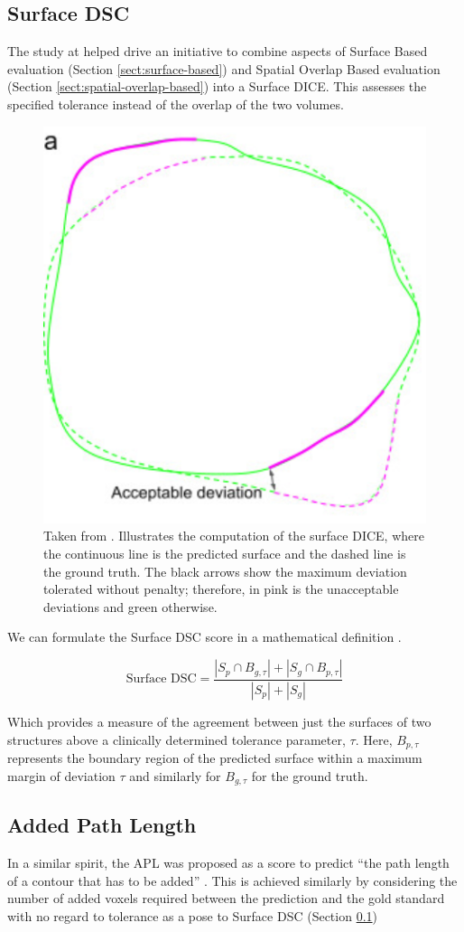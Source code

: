 \documentclass[11pt,twoside]{report}
\begin{document}
\subsection{Surface DSC} \label{sect:surface-DSC}

The study at \cite{Sherer2021-le} helped drive an initiative to combine aspects of Surface Based evaluation (Section \ref{sect:surface-based}) and Spatial Overlap Based evaluation (Section \ref{sect:spatial-overlap-based}) into a Surface DICE. This assesses the specified tolerance instead of the overlap of the two volumes. 

\begin{figure}[H]
  \centering
  \includegraphics[width=0.3\linewidth]{../figures/Surface-dice.png}
  \caption{Taken from \cite{Nikolov2021-xe}. Illustrates the computation of the surface DICE, where the continuous line is the predicted surface and the dashed line is the ground truth. The black arrows show the maximum deviation tolerated without penalty; therefore, in pink is the unacceptable deviations and green otherwise.}
\end{figure}

We can formulate the Surface DSC score in a mathematical definition \cite{Sherer2021-le}.

\begin{equation*}
  \text{Surface DSC} = \frac{|S_p \cap B_{g,\tau}| + |S_g \cap B_{p,\tau}|}{|S_p| + |S_g|}
\end{equation*}

Which provides a measure of the agreement between just the surfaces of two structures above a clinically determined tolerance parameter, $\tau$. Here, $B_{p,\tau}$ represents the  boundary region of the predicted surface within a maximum margin of deviation $\tau$ and similarly for $B_{g,\tau}$ for the ground truth.

\subsection{Added Path Length}

In a similar spirit, the APL was proposed as a score to predict ``the path length of a contour that has to be added'' \cite{APL}. This is achieved similarly by considering the number of added voxels required between the prediction and the gold standard with no regard to tolerance as a pose to Surface DSC (Section \ref{sect:surface-DSC})
\end{document}
